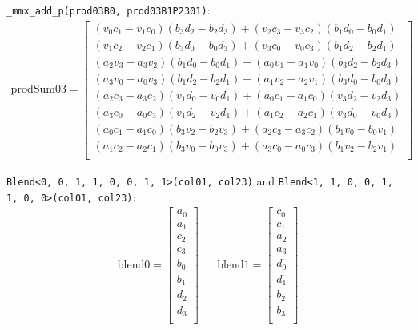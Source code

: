 \documentclass[]{scrartcl}
\newcommand{\pth}[1]{\left(#1\right)}
\begin{document}
\texttt{_mmx_add_p(prod03B0, prod03B1P2301)}:
\begin{align*}
\mathrm{prodSum03} 
=
\begin{bmatrix}
	\pth{v_0c_1 - v_1c_0}\pth{b_3d_2 - b_2d_3} 
  + \pth{v_2c_3 - v_3c_2}\pth{b_1d_0 - b_0d_1}\\
	\pth{v_1c_2 - v_2c_1}\pth{b_3d_0 - b_0d_3}
  + \pth{v_3c_0 - v_0c_3}\pth{b_1d_2 - b_2d_1}\\
	\pth{a_2v_3 - a_3v_2}\pth{b_1d_0 - b_0d_1}
  + \pth{a_0v_1 - a_1v_0}\pth{b_3d_2 - b_2d_3}\\
	\pth{a_3v_0 - a_0v_3}\pth{b_1d_2 - b_2d_1}
  + \pth{a_1v_2 - a_2v_1}\pth{b_3d_0 - b_0d_3}\\
	\pth{a_2c_3 - a_3c_2}\pth{v_1d_0 - v_0d_1}
  +	\pth{a_0c_1 - a_1c_0}\pth{v_3d_2 - v_2d_3}\\
	\pth{a_3c_0 - a_0c_3}\pth{v_1d_2 - v_2d_1}
  + \pth{a_1c_2 - a_2c_1}\pth{v_3d_0 - v_0d_3}\\
	\pth{a_0c_1 - a_1c_0}\pth{b_3v_2 - b_2v_3}
  + \pth{a_2c_3 - a_3c_2}\pth{b_1v_0 - b_0v_1}\\
	\pth{a_1c_2 - a_2c_1}\pth{b_3v_0 - b_0v_3}
  + \pth{a_3c_0 - a_0c_3}\pth{b_1v_2 - b_2v_1}\\
\end{bmatrix}
\end{align*}





\texttt{Blend<0, 0, 1, 1, 0, 0, 1, 1>(col01, col23)} and \newline
\texttt{Blend<1, 1, 0, 0, 1, 1, 0, 0>(col01, col23)}:
\begin{align*}
\mathrm{blend0} 
=
\begin{bmatrix}
a_0\\
a_1\\
c_2\\
c_3\\
b_0\\
b_1\\
d_2\\
d_3\\
\end{bmatrix}
&&
\mathrm{blend1} 
=
\begin{bmatrix}
c_0\\
c_1\\
a_2\\
a_3\\
d_0\\
d_1\\
b_2\\
b_3\\
\end{bmatrix}
\end{align*}
\end{document}
